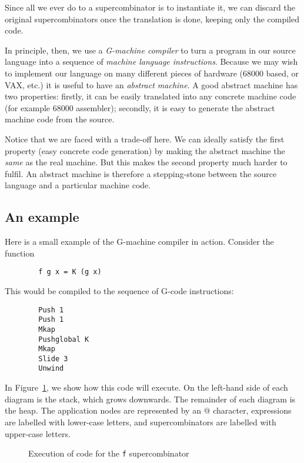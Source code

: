 Since all we ever do to a supercombinator is to instantiate it, we can
discard the original supercombinators once the translation is done,
keeping only the compiled code.

In principle, then, we use a {\em G-machine compiler\/} to turn a program in our source language into a sequence of
{\em machine language instructions}. Because we may wish to implement our language on many
different pieces of hardware (68000 based, or VAX, etc.) it is
useful to have an {\em abstract machine}. A
good abstract machine has two properties: firstly, it can be easily
translated into any concrete machine code (for example 68000
assembler); secondly, it is easy to generate the abstract machine code
from the source.

Notice that we are faced with a trade-off here. We can ideally satisfy
the first property (easy concrete code generation) by making the
abstract machine the {\em same\/} as the real machine. But this makes
the second property much harder to fulfil. An abstract machine is
therefore a stepping-stone between the source language and a
particular machine code.

\subsection{An example}

Here is a small example of the G-machine compiler in
action. Consider the function
\begin{verbatim}
        f g x = K (g x)
\end{verbatim}
This would be compiled to the sequence of G-code instructions:
\begin{verbatim}
        Push 1
        Push 1
        Mkap
        Pushglobal K
        Mkap
        Slide 3
        Unwind
\end{verbatim}
In Figure~\ref{gm:fg:1example}, we show how this code will execute. On
the left-hand side of each diagram is the stack, which grows
downwards. The remainder of each diagram is the heap. The application
nodes are represented by an @ character, expressions are labelled
with lower-case letters, and supercombinators are labelled with
upper-case letters.
\begin{figure} %


\vspace{0.25in}


\caption{Execution of code for the \mbox{\tt f} supercombinator}\label{gm:fg:1example}
\end{figure}

